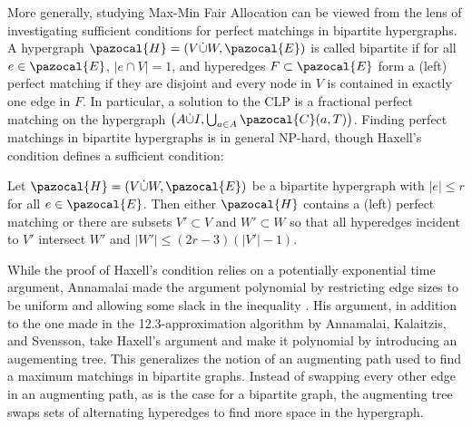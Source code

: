 More generally, studying Max-Min Fair Allocation can be viewed from the lens of investigating sufficient conditions for 
perfect matchings in bipartite hypergraphs. 
A hypergraph $\pazocal{H} = (V \dot\cup W, \pazocal{E})$ is called bipartite if for all
$e \in \pazocal{E}$, $|e \cap V|=1$, and hyperedges $F \subset \pazocal{E}$ form a (left) perfect matching 
if they are disjoint and every node in $V$ is contained in exactly one edge in $F$.
In particular, a solution to the CLP is a fractional perfect matching on the hypergraph 
$ \left(A \dot\cup I, \bigcup_{a \in A}\pazocal{C}(a,T) \right)$.  
Finding perfect matchings in bipartite hypergraphs is in general NP-hard, though
Haxell's condition defines a sufficient condition:
\begin{theorem} \cite{HypergraphMatchingsHaxell95}
Let $\pazocal{H} = (V \dot\cup W, \pazocal{E})$ be a bipartite hypergraph with $|e| \leq r$ for all $e \in \pazocal{E}$.
Then either $\pazocal{H}$ contains a (left) perfect matching or there are subsets $V' \subset V$ and $W' \subset W$
so that all hyperedges incident to $V'$ intersect $W'$ and $|W'| \leq (2r-3)(|V'|-1)$.
\end{theorem}
While the proof of Haxell's condition relies on a potentially exponential time argument, 
Annamalai made the argument polynomial by restricting edge sizes to be uniform and allowing some slack in the inequality \cite{FindingPerfectMatchingsInHypergraphs-Annamalai-SODA16}.
His argument, in addition to the one made in the 12.3-approximation algorithm by Annamalai, Kalaitzis, and Svensson,
take Haxell's argument and make it polynomial by introducing an augementing tree. 
This generalizes the notion of an augmenting path used to find a maximum matchings in bipartite graphs.
Instead of swapping every other edge in an augmenting path, as is the case for a bipartite graph,
the augmenting tree swaps sets of alternating hyperedges to find more space in the hypergraph.









